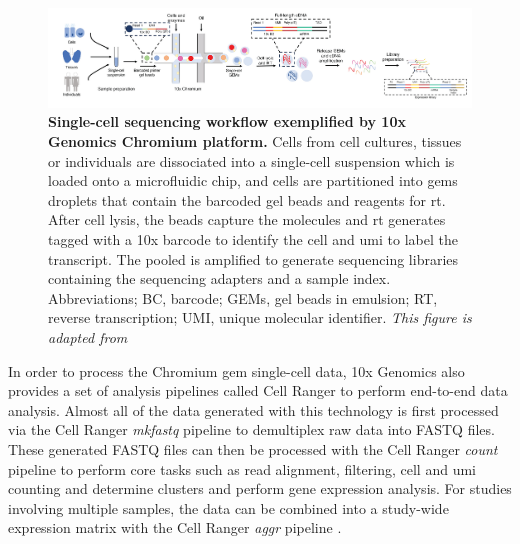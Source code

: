 \begin{figure}[H]
    \centering
    \includegraphics[width=\linewidth]{Chapter1/Fig/F1-5-03.png}
    \caption[Single-cell sequencing with 10x Genomics Chromium]{\textbf{Single-cell sequencing workflow exemplified by 10x Genomics Chromium platform.} Cells from cell cultures, tissues or individuals are dissociated into a single-cell suspension which is loaded onto a microfluidic chip, and cells are partitioned into \glspl{gem} droplets that contain the barcoded gel beads and reagents for \gls{rt}. After cell lysis, the beads capture the  molecules and \gls{rt} generates  tagged with a 10x barcode to identify the cell and \gls{umi} to label the  transcript. The pooled  is amplified to generate sequencing libraries containing the sequencing adapters and a sample index. Abbreviations; BC, barcode; GEMs, gel beads in emulsion; RT, reverse transcription; UMI, unique molecular identifier. \textit{This figure is adapted from \textbf{\cite{swaminath_use_2024}}}}
    \label{fig:chp1_10xgenomics}
\end{figure}

In order to process the Chromium \gls{gem} single-cell data, 10x Genomics also provides a set of analysis pipelines called Cell Ranger to perform end-to-end data analysis. Almost all of the data generated with this technology is first processed via the Cell Ranger \textit{mkfastq} pipeline to demultiplex raw data into FASTQ files. These generated FASTQ files can then be processed with the Cell Ranger \textit{count} pipeline to perform core tasks such as read alignment, filtering, cell and \gls{umi} counting and determine clusters and perform gene expression analysis. For studies involving multiple samples, the data can be combined into a study-wide expression matrix with the Cell Ranger \textit{aggr} pipeline \textbf{\cite{noauthor_what_nodate}}. 


